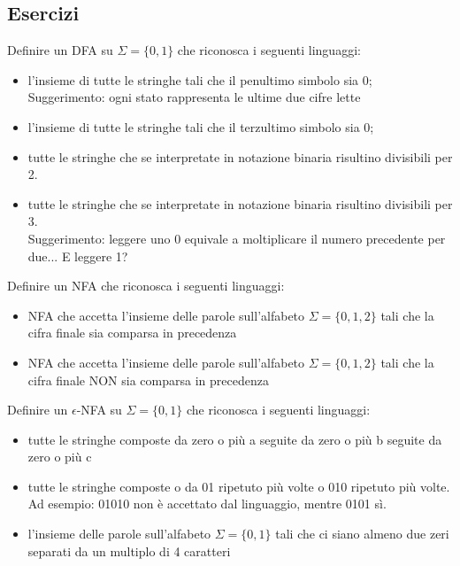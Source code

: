 \documentclass[a4paper,11pt]{article}
\begin{document}
\subsection{Esercizi}
Definire un DFA su \begin{math}\Sigma = \{0, 1\}\end{math} che riconosca i seguenti linguaggi:
    \begin{itemize}
        \item l’insieme di tutte le stringhe tali che il penultimo simbolo sia 0;\\Suggerimento: ogni stato rappresenta le ultime due cifre lette
        \item l’insieme di tutte le stringhe tali che il terzultimo simbolo sia 0;
        \item tutte le stringhe che se interpretate in notazione binaria risultino divisibili per 2.
        \item tutte le stringhe che se interpretate in notazione binaria risultino divisibili per 3.\\Suggerimento: leggere uno 0 equivale a moltiplicare il numero precedente per due... E leggere 1?
    \end{itemize}
    Definire un NFA che riconosca i seguenti linguaggi:
    \begin{itemize}
    \item NFA che accetta l'insieme delle parole sull’alfabeto \begin{math}\Sigma = \{0, 1, 2\}\end{math} tali che la cifra finale sia comparsa in precedenza
    \item NFA che accetta l'insieme delle parole sull’alfabeto \begin{math}\Sigma = \{0, 1, 2\}\end{math} tali che la cifra finale NON sia comparsa in precedenza
    \end{itemize}
Definire un \begin{math}\epsilon\end{math}-NFA su \begin{math}\Sigma = \{0, 1\}\end{math} che riconosca i seguenti linguaggi:
    \begin{itemize}
        \item tutte le stringhe composte da zero o più a seguite da zero o più b seguite da zero o più c
        \item tutte le stringhe composte o da 01 ripetuto più volte o 010 ripetuto più volte. Ad esempio: 01010 non è accettato dal linguaggio, mentre 0101 sì.
        \item l'insieme delle parole sull’alfabeto \begin{math}\Sigma = \{0, 1\}\end{math} tali che ci siano almeno due zeri separati da un multiplo di 4 caratteri
    \end{itemize}
\end{document}
